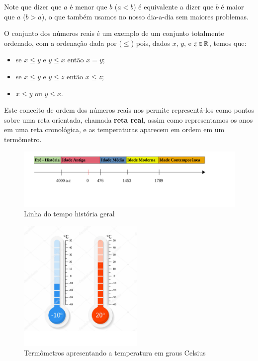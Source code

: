 Note que dizer que $a$ é menor que $b$ ($a < b$) é equivalente a dizer que $b$ é maior que $a$ ($b > a$), o que também usamos no nosso dia-a-dia sem maiores problemas.

O conjunto dos números reais é um exemplo de um conjunto totalmente ordenado, com a ordenação dada por ($\leq$) pois, dados $x$, $y$, e $z \in \mathbb{R}$, temos que:
\begin{itemize}
\item se $x \leq y$ e $y \leq x$ então $x= y$;
\item se $x \leq y$ e $y \leq z$ então $x \leq z$;
\item $x \leq y$ ou $y \leq x$. 
\end{itemize}

Este conceito de ordem dos números reais nos permite representá-los como pontos sobre uma reta orientada, chamada \textbf{reta real}, assim como representamos os anos em uma reta cronológica, e as temperaturas aparecem em ordem em um termômetro. 

 \begin{figure}[H]
 \centering
 \includegraphics[width=15cm]{../Topicos/Figuras/RetaCronologica.pdf}
 \caption{Linha do tempo história geral}
 \end{figure}
 
 \begin{figure}[H]
 \centering
 \includegraphics[width=6cm]{../Topicos/Figuras/Termometro.pdf}
 \caption{Termômetros apresentando a temperatura em graus Celsius}
 \end{figure}
 
